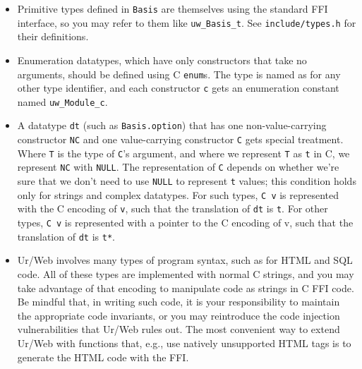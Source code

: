 \documentclass{article}
\begin{document}
\begin{itemize}
  \item Primitive types defined in \texttt{Basis} are themselves using the standard FFI interface, so you may refer to them like \texttt{uw\_Basis\_t}.  See \texttt{include/types.h} for their definitions.
  \item Enumeration datatypes, which have only constructors that take no arguments, should be defined using C \texttt{enum}s.  The type is named as for any other type identifier, and each constructor \texttt{c} gets an enumeration constant named \texttt{uw\_Module\_c}.
  \item A datatype \texttt{dt} (such as \texttt{Basis.option}) that has one non-value-carrying constructor \texttt{NC} and one value-carrying constructor \texttt{C} gets special treatment.  Where \texttt{T} is the type of \texttt{C}'s argument, and where we represent \texttt{T} as \texttt{t} in C, we represent \texttt{NC} with \texttt{NULL}.  The representation of \texttt{C} depends on whether we're sure that we don't need to use \texttt{NULL} to represent \texttt{t} values; this condition holds only for strings and complex datatypes.  For such types, \texttt{C v} is represented with the C encoding of \texttt{v}, such that the translation of \texttt{dt} is \texttt{t}.  For other types, \texttt{C v} is represented with a pointer to the C encoding of v, such that the translation of \texttt{dt} is \texttt{t*}.
  \item Ur/Web involves many types of program syntax, such as for HTML and SQL code.  All of these types are implemented with normal C strings, and you may take advantage of that encoding to manipulate code as strings in C FFI code.  Be mindful that, in writing such code, it is your responsibility to maintain the appropriate code invariants, or you may reintroduce the code injection vulnerabilities that Ur/Web rules out.  The most convenient way to extend Ur/Web with functions that, e.g., use natively unsupported HTML tags is to generate the HTML code with the FFI.
\end{itemize}
\end{document}
